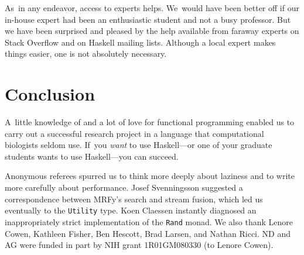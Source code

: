 \documentclass[preprint,nonatbib,blockstyle,times]{sigplanconf}
\newcommand\mrfy{MRFy} %
\begin{document}
As~in any endeavor, access to experts helps.
We~would have been better off if our in-house expert had been an
enthusiastic student and not a busy professor.
But we have been surprised and pleased by the help available from
faraway experts on Stack Overflow and on Haskell mailing lists.
Although a local expert makes things easier, one is not
 absolutely necessary.

\section{Conclusion}

A~little knowledge of and a lot of love for functional programming
enabled us to carry out a successful research project in a language
that computational biologists seldom use.
If~you \emph{want} to use Haskell---or one of your graduate students
wants to use Haskell---you can
succeed. 




%  

 

\acks

Anonymous referees spurred us to think
more deeply about laziness and to write more carefully about performance.
Josef Svenningsson suggested a correspondence between \mrfy's search
and stream fusion, which led us eventually to the \texttt{Utility} type.
Koen Claessen instantly diagnosed an inappropriately strict
implementation of the \texttt{Rand} monad.
We also thank Lenore Cowen, Kathleen Fisher, Ben Hescott, Brad
Larsen, and Nathan Ricci.
ND and AG were funded in part by NIH grant 1R01GM080330 (to Lenore Cowen).



\end{document}
